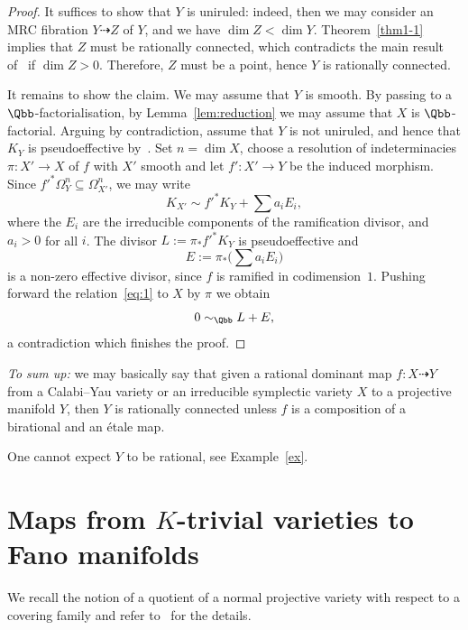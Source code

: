 \begin{proof}
It suffices to show that $Y$ is uniruled: indeed, then we may consider an MRC fibration $Y\dashrightarrow Z$ of $Y$, and we have $\dim Z<\dim Y$. Theorem~\ref{thm1-1} implies that $Z$ must be rationally connected, which contradicts the main result of~\cite{GHS03} if $\dim Z>0$. Therefore, $Z$ must be a point, hence $Y$ is rationally connected.

It remains to show the claim. We may assume that $Y$ is smooth. By passing to a $\Qbb$-factorialisation, by Lemma~\ref{lem:reduction} we may assume that $X$ is $\Qbb$-factorial. Arguing by contradiction, assume that $Y$ is not uniruled, and hence that $K_Y$ is pseudoeffective by~\cite[Corollary~0.3]{BDPP}. Set $n = \dim X$, choose a resolution of indeterminacies $\pi\colon X' \to X$ of $f$ with $X'$ smooth and let $f'\colon X' \to Y$ be the induced morphism. Since $f'^*\Omega^n_Y \subseteq \Omega^n_{X'}$, we may write
\begin{equation}\label{eq:1}
K_{X'} \sim f'^*K_Y + \sum a_i E_i,
\end{equation}
where the $E_i $ are the irreducible components of the ramification divisor, and $a_i>0$ for all $i$. The divisor $L := \pi_*f'^*K_Y $ is pseudoeffective and
\[
E:=\pi_*\big(\sum a_i E_i\big)
\]
is a non-zero effective divisor, since $f$ is ramified in codimension~$1$. Pushing forward the relation~\eqref{eq:1} to $X$ by $\pi$ we obtain
\[
0 \sim_\Qbb L + E,
\]
a contradiction which finishes the proof.
\end{proof}

\emph{To sum up:} we may basically say that given a rational dominant map $f\colon X \dasharrow Y $ from a Calabi--Yau variety or an irreducible symplectic variety $X$ to a projective manifold $Y$, then $Y$ is rationally connected unless $f$ is a composition of a birational and an étale map.

\begin{rema}\label{rema:main3.5}
One cannot expect $Y$ to be rational, see Example~\ref{ex}.
\end{rema}

\section{Maps from \texorpdfstring{$K$}{K}-trivial varieties to Fano manifolds}\label{sect-4}

We recall the notion of a quotient of a normal projective variety with respect to a covering family and refer to~\cite{Ca81,Ca04,BCE+} for the details.

